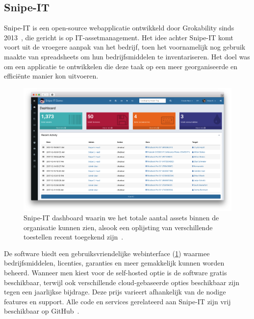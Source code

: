 \subsection{Snipe-IT}
\label{sub:snipe-it}

Snipe-IT is een open-source webapplicatie ontwikkeld door Grokability sinds 2013~\autocite{snipe-it-introduction}, die gericht is op IT-assetmanagement.
Het idee achter Snipe-IT komt voort uit de vroegere aanpak van het bedrijf, toen het voornamelijk nog gebruik maakte van spreadsheets om hun bedrijfsmiddelen te inventariseren.
Het doel was om een applicatie te ontwikkelen die deze taak op een meer georganiseerde en effici\"ente manier kon uitvoeren.

\begin{figure}[h!]
    \includegraphics[width=\textwidth]
    {./graphics/state-of-the-art/snipe-dashboard.png}
    \caption[Snipe-IT dashboard voor assets.]{\label{fig:snipe-it-dashboard}Snipe-IT dashboard waarin we het totale aantal assets binnen de organisatie kunnen zien, alsook een oplijsting van verschillende toestellen recent toegekend zijn~\autocite{snipe-it-dashboard}.}
\end{figure}

De software biedt een gebruiksvriendelijke webinterface (\ref{fig:snipe-it-dashboard}) waarmee bedrijfsmiddelen, licenties, garanties en meer gemakkelijk kunnen worden beheerd.
Wanneer men kiest voor de self-hosted optie is de software gratis beschikbaar, terwijl ook verschillende cloud-gebaseerde opties beschikbaar zijn tegen een jaarlijkse bijdrage.
Deze prijs varieert afhankelijk van de nodige features en support.
Alle code en services gerelateerd aan Snipe-IT zijn vrij beschikbaar op GitHub~\autocite{snipe-it-github}.

